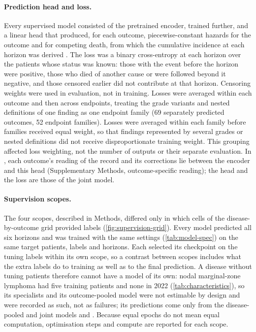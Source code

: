 \paragraph{Prediction head and loss.} Every supervised model consisted of the
pretrained encoder, trained further, and a linear head that produced, for each
outcome, piecewise-constant hazards for the outcome and for competing death,
from which the cumulative incidence at each horizon was derived
\citep{gensheimer2019nnetsurvival,lee2018deephit}. The loss was a binary
cross-entropy at each horizon over the patients whose status was known: those
with the event before the horizon were positive, those who died of another cause
or were followed beyond it negative, and those censored earlier did not
contribute at that horizon. Censoring weights were used in evaluation, not in
training. Losses were averaged within each outcome and then across endpoints,
treating the grade variants and nested definitions of one finding as one
endpoint family (69 separately predicted outcomes, 52 endpoint families).
Losses were averaged within each family before families received equal weight,
so that findings represented by several grades or nested definitions did not
receive disproportionate training weight. This grouping affected loss weighting,
not the number of outputs or their separate evaluation. In \opera{}, each
outcome's reading of the record and its corrections lie between the encoder and
this head (Supplementary Methods, outcome-specific reading); the head and the loss are those of the
joint model.

\paragraph{Supervision scopes.} The four scopes, described in Methods, differed
only in which cells of the disease-by-outcome grid provided labels
(\cref{fig:supervision-grid}). Every model
predicted all six horizons and was trained with the same settings
(\cref{tab:model-spec}) on the same target patients, labels and horizons. Each
selected its checkpoint on the tuning labels within its own scope, so a
contrast between scopes includes what the extra labels do to training as well
as to the final prediction. A disease without tuning patients therefore cannot
have a model of its own: nodal marginal-zone lymphoma had five training patients
and none in 2022 (\cref{tab:characteristics}), so its specialists and its
outcome-pooled model were not estimable by design and were recorded as such,
not as failures; its predictions come only from the disease-pooled and joint
models and \opera{}. Because equal epochs do not mean equal computation,
optimisation steps and compute are reported for each scope.

